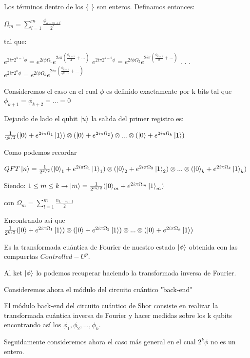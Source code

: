 Los términos dentro de los \{ \} son enteros. Definamos entonces:

$\Omega_m = \sum\limits_{l=1}^m \frac{\phi_{k-m+l}}{2^l}$

tal que:

$e^{2 i \pi 2^{k-1} \phi} = e^{2 i \phi \Omega_1} e^{2 i \pi (\frac{\phi_{k+1}}{4} + ...)}$
$e^{2 i \pi 2^{k-2} \phi} = e^{2 i \phi \Omega_2} e^{2 i \pi (\frac{\phi_{k+1}}{8} + ...)}$
.
.
.
$e^{2 i \pi 2^0 \phi} = e^{2 i \phi \Omega_k} e^{2 i \pi (\frac{\phi_{k+1}}{2^{k+1}} + ...)}$

Consideremos el caso en el cual $\phi$ es definido exactamente por k bits tal que $\phi_{k+1} = \phi_{k+2} = ... = 0$

Dejando de lado el qubit $\ket{u}$ la salida del primer registro es:

$\frac{1}{2^{k/2}} (\ket{0} + e^{2 i \pi \Omega_1} \ket{1}) \otimes (\ket{0} + e^{2 i \pi \Omega_2}) \otimes ... \otimes (\ket{0} + e^{2 i \pi \Omega_k} \ket{1})$

Como podemos recordar

$QFT \ket{n} = \frac{1}{2^{k/2}} (\ket{0}_1 + e^{2 i \pi \Omega_1} \ket{1}_1) \otimes (\ket{0}_2 +  e^{2 i \pi \Omega_2} \ket{1}_2) \otimes ... \otimes (\ket{0}_k + e^{2 i \pi \Omega_k} \ket{1}_k)$

Siendo: $1 \leq m \leq k \rightarrow \ket{m} = \frac{1}{2^{m/2}} (\ket{0}_m + e^{2 i \pi \Omega_m} \ket{1}_m)$

con $\Omega_m = \sum\limits_{l=1}^m \frac{n_{k-m+l}}{2}$

Encontrando así que $\frac{1}{2^{k/2}} (\ket{0} + e^{2 i \pi \Omega_1} \ket{1}) \otimes (\ket{0} + e^{2 i \pi \Omega_2} \ket{1}) \otimes ... \otimes (\ket{0} + e^{2 i \pi \Omega_k} \ket{1})$

Es la transformada cuántica de Fourier de nuestro estado $\ket{\phi}$ obtenida con las compuertas $Controlled-U^p$.

Al ket $\ket{\phi}$ lo podemos recuperar haciendo la transformada inversa de Fourier.

Consideremos ahora el módulo del circuito cuántico "back-end"


El módulo back-end del circuito cuántico de Shor consiste en realizar la transformada cuántica inversa de Fourier y hacer medidas sobre los k qubits encontrando así los $\phi_1, \phi_2,...,\phi_k$.

Seguidamente consideremos ahora el caso más general en el cual $2^k \phi$ no es un entero.

